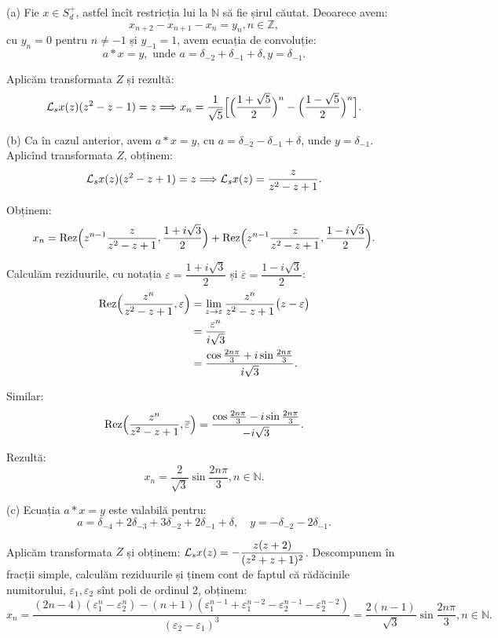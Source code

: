 (a) Fie $x \in S_d^+$, astfel încît restricția lui la $\mathbb{N}$ să fie șirul 
căutat. Deoarece avem: 
\[
  x_{n+2} - x_{n+1} - x_n = y_n, n \in \mathbb{Z},
\]
cu $y_n = 0$ pentru $n \neq -1$ și $y_{-1} = 1$, avem ecuația de convoluție: 
\[
  a \ast x = y, \text{ unde } a 
  = \delta_{-2} + \delta_{-1} + \delta, y = \delta_{-1}.
\]

Aplicăm transformata $Z$ și rezultă: 
\[
  \mathcal{L}_s x(z) (z^2 - z - 1) = z \Longrightarrow x_n 
  = \dfrac{1}{\sqrt{5}} \Big[ \Big( \dfrac{1 + \sqrt{5}}{2} \Big)^n - 
  \Big( \dfrac{1 - \sqrt{5}}{2} \Big)^n \Big].
\]

(b) Ca în cazul anterior, avem $a \ast x = y$, cu 
$a = \delta_{-2} - \delta_{-1} + \delta$, unde $y = \delta_{-1}$. Aplicînd 
transformata $Z$, obținem: 
\[
  \mathcal{L}_s x(z) (z^2 - z + 1) = z \Longrightarrow \mathcal{L}_s x(z) 
  = \dfrac{z}{z^2 - z + 1}.
\]

Obținem:
\[
  x_n = \mathrm{Rez} \Big( z^{n-1} \dfrac{z}{z^2 - z + 1}, 
  \dfrac{1 + i \sqrt{3}}{2} \Big) + \mathrm{Rez} \Big( z^{n-1} \dfrac{z}{z^2 - z + 1}, 
  \dfrac{1 - i \sqrt{3}}{2} \Big).
\]

Calculăm reziduurile, cu notația $\varepsilon = \dfrac{1 + i \sqrt{3}}{2}$ și 
$\overline{\varepsilon} = \dfrac{1 - i \sqrt{3}}{2}$:
\begin{align*}
  \mathrm{Rez} \Big( \dfrac{z^n}{z^2 - z + 1}, \varepsilon \Big) 
  &= \lim_{z \to \varepsilon} \dfrac{z^n}{z^2 - z + 1} 
    \big( z - \varepsilon \big) \\
  &= \dfrac{\varepsilon^n}{i \sqrt{3}} \\
  &= \dfrac{\cos \frac{2 n \pi}{3} + i \sin \frac{2 n \pi}{3}}{i \sqrt{3}}.
\end{align*}

Similar: 
\[
  \mathrm{Rez} \Big( \dfrac{z^n}{z^2 - z + 1}, \overline{\varepsilon} \Big) 
  = \dfrac{\cos \frac{2n\pi}{3} - i \sin \frac{2 n \pi}{3}}{-i\sqrt{3}}.
\]

Rezultă: 
\[
  x_n = \dfrac{2}{\sqrt{3}} \sin \dfrac{2n\pi}{3}, n \in \mathbb{N}.
\]

(c) Ecuația $a \ast x = y$ este valabilă pentru: 
\[
  a = \delta_{-4} + 2 \delta_{-3} + 3 \delta_{-2} + 2 \delta_{-1} + \delta, 
  \quad y = -\delta_{-2} - 2 \delta_{-1}.
\]

Aplicăm transformata $Z$ și obținem: 
$\mathcal{L}_s x(z) = - \dfrac{z(z+2)}{(z^2 + z + 1)^2}$. Descompunem în fracții 
simple, calculăm reziduurile și ținem cont de faptul că rădăcinile numitorului, 
$\varepsilon_1, \varepsilon_2$ sînt poli de ordinul 2, obținem: 
\[
  x_n = \dfrac{(2n-4)(\varepsilon_1^n - \varepsilon_2^n) - 
    (n+1)(\varepsilon_1^{n-1} + \varepsilon_1^{n-2} - \varepsilon_2^{n-1} - 
    \varepsilon_2^{n-2})}{(\varepsilon_2 - \varepsilon_1)^3} 
  = \dfrac{2(n-1)}{\sqrt{3}} \sin \dfrac{2 n \pi}{3}, n \in \mathbb{N}.
\]

